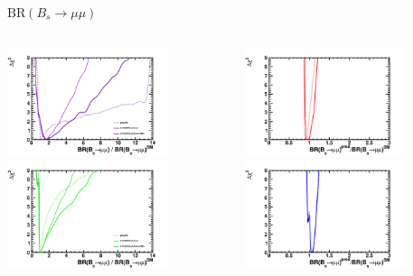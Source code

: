\documentclass{beamer}
\begin{document}
\begin{frame}{$\textrm{BR}(B_{s}\rightarrow\mu\mu)$}
  \begin{columns}
    \begin{column}{0.5\textwidth}
      \includegraphics[height=3.2cm]{bsmm/nuhm1.pdf}\vfill 
      \includegraphics[height=3.2cm]{bsmm/cmssm.pdf}
    \end{column}
    \begin{column}{0.5\textwidth}
      \includegraphics[height=3.2cm]{bsmm/vcmssm.pdf}\vfill 
      \includegraphics[height=3.2cm]{bsmm/msugra.pdf}
    \end{column}
  \end{columns}
\end{frame}
\end{document}
